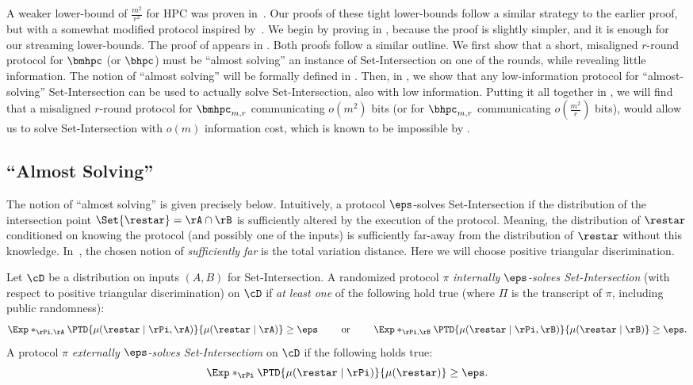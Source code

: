  A weaker lower-bound of $\frac{m^2}{r^2}$ for HPC was proven in~\cite{AssadiCK19}.
 Our proofs of these tight lower-bounds follow a similar strategy to the earlier
 proof, but with a somewhat modified protocol inspired by~\cite{Yehudayoff20}.
We begin by proving  in , because the proof is slightly simpler, and it is enough for our streaming lower-bounds. The proof of  appears in .
%
Both proofs follow a similar outline. We first show that a short, misaligned $r$-round protocol for $\bmhpc$ (or $\bhpc$) must be ``almost solving'' an instance of Set-Intersection on one of the rounds, while revealing little information.
%
The notion of ``almost solving'' will be formally defined in . 
%
Then, in , we show that any low-information protocol for ``almost-solving'' Set-Intersection can be used to actually solve Set-Intersection, also with low information. 
%
Putting it all together in , we will find that a misaligned $r$-round protocol for $\bmhpc_{m,r}$ communicating $o(m^2)$ bits (or for $\bhpc_{m,r}$ communicating $o(\frac{m^2}{r})$ bits), would allow us to solve Set-Intersection with $o(m)$ information cost, which is known to be impossible by \cite{JayramKS03}.


\subsection{``Almost Solving''}\label{sec:almost-solving}

The notion of ``almost solving'' is given precisely below.
Intuitively, a protocol $\eps$-solves Set-Intersection if the distribution of
the intersection point $\Set{\restar} = \rA \cap \rB$ is sufficiently altered by
the execution of the protocol.
Meaning, the distribution of $\restar$ conditioned on knowing the protocol (and
possibly one of the inputs) is sufficiently far-away from the distribution of
$\restar$ without this knowledge.
In~\cite{AssadiCK19}, the chosen notion of \textit{sufficiently far} is the
total variation distance.
Here we will choose positive triangular discrimination.

\begin{definition}\label{def:eps-solving}
Let $\cD$ be a distribution on inputs $(A, B)$ for Set-Intersection.
A randomized protocol $\pi$ \textit{internally $\eps$-solves Set-Intersection} (with
respect to positive triangular discrimination) on $\cD$ if \textit{at least one}
of the following hold true (where $\Pi$ is the transcript of $\pi$, including
public randomness):
\[
  \Exp*_{\rPi, \rA}{\PTD{\mu(\restar \mid \rPi, \rA)}{\mu(\restar \mid \rA)}} \geq \eps
  \qquad\text{ or } \qquad
  \Exp*_{\rPi, \rB}{\PTD{\mu(\restar \mid \rPi, \rB)}{\mu(\restar \mid \rB)}} \geq \eps.
\]
A protocol $\pi$ \textit{externally $\eps$-solves Set-Intersectiom} on $\cD$ if
the following holds true:
\[
  \Exp*_{\rPi}{\PTD{\mu(\restar \mid \rPi)}{\mu(\restar )}} \geq \eps.
\]
\end{definition}

